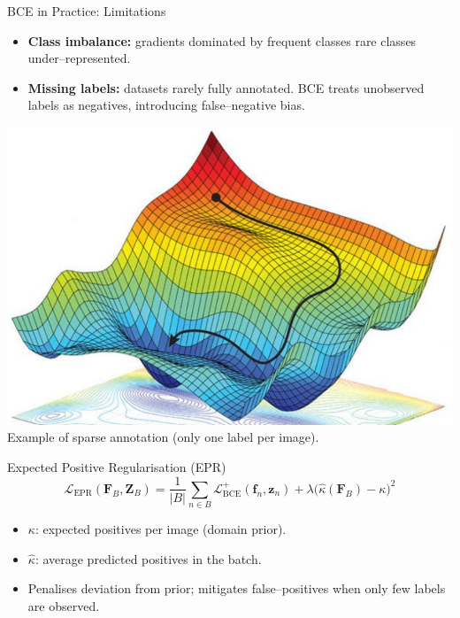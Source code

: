 
\begin{frame}{BCE in Practice: Limitations}
\begin{itemize}
  \item \textbf{Class imbalance:} gradients dominated by frequent classes \textrightarrow{} rare classes under--represented.
  \item \textbf{Missing labels:} datasets rarely fully annotated. BCE treats unobserved labels as negatives, introducing false--negative bias.
\end{itemize}
\vspace{0.5em}
\centering
\includegraphics[width=0.55\linewidth]{Images/loss_optimization.png}\\
\scriptsize Example of sparse annotation (only one label per image).
\end{frame}


\begin{frame}{Expected Positive Regularisation (EPR)}
\begin{equation*}
\mathcal{L}_{\text{EPR}}(\mathbf{F}_B,\mathbf{Z}_B)=\frac{1}{|B|}\sum_{n\in B}\mathcal{L}_{\text{BCE}}^{+}(\mathbf{f}_n,\mathbf{z}_n)+\lambda\bigl(\hat{\kappa}(\mathbf{F}_B)-\kappa\bigr)^{2}
\end{equation*}
\begin{itemize}
  \item $\kappa$: expected positives per image (domain prior).
  \item $\hat{\kappa}$: average predicted positives in the batch.
  \item Penalises deviation from prior; mitigates false--positives when only few labels are observed.
\end{itemize}
\end{frame}


